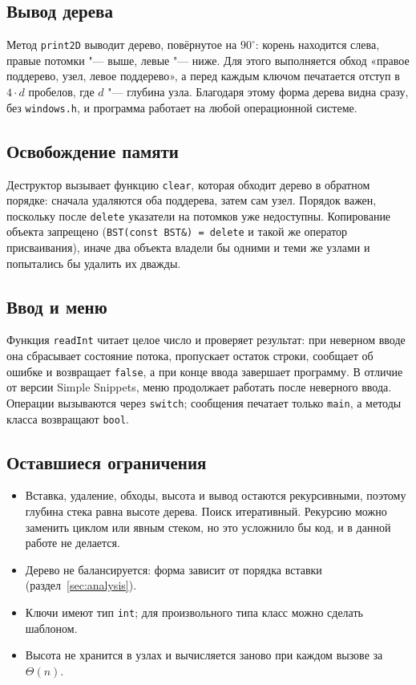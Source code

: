 \documentclass[otchet]{SCWorks}
\begin{document}
\subsection{Вывод дерева}

Метод \texttt{print2D} выводит дерево, повёрнутое на $90^\circ$:
корень находится слева, правые потомки "--- выше, левые "--- ниже. Для этого
выполняется обход «правое поддерево, узел, левое поддерево», а перед
каждым ключом печатается отступ в $4 \cdot d$ пробелов, где $d$ "--- глубина
узла. Благодаря этому форма дерева видна сразу, без \texttt{windows.h}, и
программа работает на любой операционной системе.

\subsection{Освобождение памяти}

Деструктор вызывает функцию \texttt{clear}, которая обходит дерево в
обратном порядке: сначала удаляются оба поддерева, затем сам узел. Порядок
важен, поскольку после \texttt{delete} указатели на потомков уже
недоступны. Копирование объекта запрещено (\texttt{BST(const BST\&) = delete}
и такой же оператор присваивания), иначе два объекта владели бы одними и
теми же узлами и попытались бы удалить их дважды.

\subsection{Ввод и меню}

Функция \texttt{readInt} читает целое число и проверяет результат:
при неверном вводе она сбрасывает состояние потока, пропускает остаток
строки, сообщает об ошибке и возвращает \texttt{false}, а при конце ввода
завершает программу. В отличие от версии Simple Snippets, меню продолжает
работать после неверного ввода. Операции вызываются через
\texttt{switch}; сообщения печатает только \texttt{main}, а методы класса
возвращают \texttt{bool}.

\subsection{Оставшиеся ограничения}
\label{sec:limits}

\begin{itemize}
  \item Вставка, удаление, обходы, высота и вывод остаются рекурсивными,
        поэтому глубина стека равна высоте дерева. Поиск итеративный.
        Рекурсию можно заменить циклом или явным стеком, но это усложнило
        бы код, и в данной работе не делается.
  \item Дерево не балансируется: форма зависит от порядка вставки
        (раздел~\ref{sec:analysis}).
  \item Ключи имеют тип \texttt{int}; для произвольного типа класс можно
        сделать шаблоном.
  \item Высота не хранится в узлах и вычисляется заново при каждом
        вызове за $\Theta(n)$.
\end{itemize}
\end{document}
